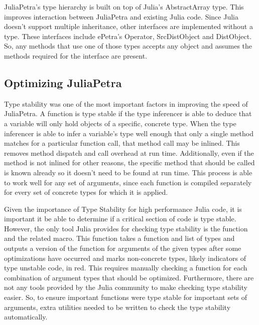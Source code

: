 \documentclass[acmsmall]{acmart}
\newcommand{\juliaSnippet}[1]{\texttt{\detokenize{#1}}}
\begin{document}
JuliaPetra's type hierarchy is built on top of Julia's AbstractArray type.  This improves
interaction between JuliaPetra and existing Julia code.
Since Julia doesn't support multiple inheritance, %
other interfaces are implemented without a type.
These interfaces include ePetra's Operator, SrcDistObject and DistObject.
So, any methods that use one of those types accepts any object and assumes
the methods required for the interface are present.

\subsection{Optimizing JuliaPetra}

Type stability was one of the most important factors in improving the speed of JuliaPetra.
A function is type stable if the type inferencer is able to deduce that a variable will only
hold objects of a specific, concrete type.
When the type inferencer is able to infer a variable's type well enough that only a single
method matches for a particular function call, that method call may be inlined. \cite{JuliaDesignPaper}
This removes method dispatch and call overhead at run time.
Additionally, even if the method is not inlined for other reasons, the specific method that should
be called is known already so it doesn't need to be found at run time.
This process is able to work well for any set of arguments, since each function is compiled
separately for every set of concrete types for which it is applied.  \cite{JuliaFreshApproach}

Given the importance of Type Stability for high performance Julia code, it is important it be able
to determine if a critical section of code is type stable.
However, the only tool Julia provides for checking type stability is the \juliaSnippet{code_warntype}
function and the related \juliaSnippet{@code_warntype} macro.  This function takes a function and list
of types and outputs a version of the function for arguments of the given types after some optimizations
have occurred and marks non-concrete types, likely indicators of type unstable code, in red.
This requires manually checking a function for each combination of argument types that should be optimized.
Furthermore, there are not any tools provided by the Julia community to make checking type stability easier.
So, to ensure important functions were type stable for important sets of arguments,
extra utilities needed to be written to check the type stability automatically.
\end{document}
